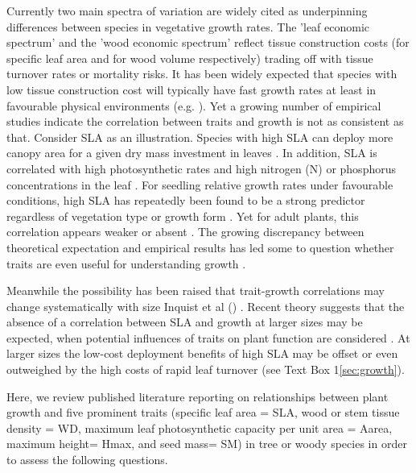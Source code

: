 \documentclass[a4paper]{article}\usepackage[]{graphicx}\usepackage[]{color}
\begin{document}
Currently two main spectra of variation are widely cited as underpinning differences between species in vegetative growth rates. The 'leaf economic spectrum' \citep{Wright:2004jb} and the 'wood economic spectrum' \citep{Chave:2009iy} reflect tissue construction costs (for specific leaf area and for wood volume respectively) trading off with tissue turnover rates or mortality risks. It has been widely expected that species with low tissue construction cost will typically have fast growth rates at least in favourable physical environments (e.g. \citealt{MullerLandau:2004dc,Wright:2004jb,Poorter:2008iu,Chave:2009iy,Larjavaara:2010bn,Iida:2012jb,Paine:2015df}). Yet a growing number of empirical studies indicate the correlation between traits and growth is not as consistent as that. Consider SLA as an illustration. Species with high SLA can deploy more canopy area for a given dry mass investment in leaves \citep{Poorter:1999wd, Reich:1992wm}. In addition, SLA is correlated with high photosynthetic rates and high nitrogen (N) or phosphorus concentrations in the leaf \citep{Wright:2004jb}. For seedling relative growth rates under favourable conditions, high SLA has repeatedly been found to be a strong predictor regardless of vegetation type or growth form \citep{Lambers:1992bj,Reich:1992wm,Grime:1997wm,Poorter:1999wd,Wright:1999ds}. Yet for adult plants, this correlation appears weaker or absent \citep{coomes_comparison_1998,Poorter:2008iu,Aiba:2009ft,Easdale:2009gv,Wright:2010tp}. The growing discrepancy between theoretical expectation and empirical results has led some to question whether traits are even useful for understanding growth \citep{Wright:2010tp, Paine:2015df}.

Meanwhile the possibility has been raised that trait-growth correlations may change systematically with size Inquist et al () \citep{Falster:2011ii, Ruger:2012jv, Iida:2014ep, Iida:2014hq}. Recent theory suggests that the absence of a correlation between SLA and growth at larger sizes may be expected, when potential influences of traits on plant function are considered \citep{Falster:2011ii, falster:2013}. At larger sizes the low-cost deployment benefits of high SLA may be offset or even outweighed by the high costs of rapid leaf turnover (see Text Box 1\ref{sec:growth}). 

Here, we review published literature reporting on relationships between plant growth and five prominent traits (specific leaf area = SLA, wood or stem tissue density = WD, maximum leaf photosynthetic capacity per unit area = Aarea,  maximum height= Hmax, and seed mass= SM) in tree or woody species in order to assess the following questions. 
\end{document}
